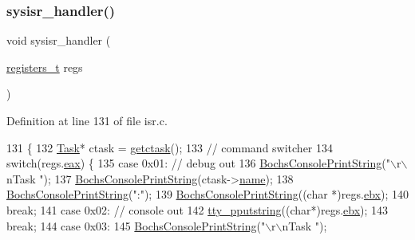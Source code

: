 \subsubsection{\texorpdfstring{sysisr\+\_\+handler()}{sysisr\_handler()}}
{\footnotesize\ttfamily void sysisr\+\_\+handler (\begin{DoxyParamCaption}\item[{\hyperlink{a00095_adf58dbaf6139b4957c348711f2026957_adf58dbaf6139b4957c348711f2026957}{registers\+\_\+t}}]{regs }\end{DoxyParamCaption})}



Definition at line 131 of file isr.\+c.


\begin{DoxyCode}
131                                       \{
132     \hyperlink{a00182}{Task}* ctask = \hyperlink{a00068_a5913e9b2190b2b4118ee020721a320e2_a5913e9b2190b2b4118ee020721a320e2}{getctask}();
133     \textcolor{comment}{// command switcher}
134     \textcolor{keywordflow}{switch}(regs.\hyperlink{a00202_a1e01e806248cd98e55e0b053db6a6a51_a1e01e806248cd98e55e0b053db6a6a51}{eax}) \{
135         \textcolor{keywordflow}{case} 0x01: \textcolor{comment}{// debug out}
136             \hyperlink{a00056_a19e1f554d03c977f8b947f21489daa41_a19e1f554d03c977f8b947f21489daa41}{BochsConsolePrintString}(\textcolor{stringliteral}{"\(\backslash\)r\(\backslash\)nTask "});
137             \hyperlink{a00056_a19e1f554d03c977f8b947f21489daa41_a19e1f554d03c977f8b947f21489daa41}{BochsConsolePrintString}(ctask->\hyperlink{a00182_a9cf84d1792cda878178fd3691e472b97_a9cf84d1792cda878178fd3691e472b97}{name});
138             \hyperlink{a00056_a19e1f554d03c977f8b947f21489daa41_a19e1f554d03c977f8b947f21489daa41}{BochsConsolePrintString}(\textcolor{stringliteral}{":"});
139             \hyperlink{a00056_a19e1f554d03c977f8b947f21489daa41_a19e1f554d03c977f8b947f21489daa41}{BochsConsolePrintString}((\textcolor{keywordtype}{char} *)regs.\hyperlink{a00202_aa8989b2fef42dca1d656f724eb324f51_aa8989b2fef42dca1d656f724eb324f51}{ebx});
140             \textcolor{keywordflow}{break};
141         \textcolor{keywordflow}{case} 0x02: \textcolor{comment}{// console out}
142             \hyperlink{a00140_ade960b1320324706aac6c00cc6b1b2fe_ade960b1320324706aac6c00cc6b1b2fe}{tty\_pputstring}((\textcolor{keywordtype}{char}*)regs.\hyperlink{a00202_aa8989b2fef42dca1d656f724eb324f51_aa8989b2fef42dca1d656f724eb324f51}{ebx});
143             \textcolor{keywordflow}{break};
144         \textcolor{keywordflow}{case} 0x03:
145             \hyperlink{a00056_a19e1f554d03c977f8b947f21489daa41_a19e1f554d03c977f8b947f21489daa41}{BochsConsolePrintString}(\textcolor{stringliteral}{"\(\backslash\)r\(\backslash\)nTask "});

\end{DoxyCode}
